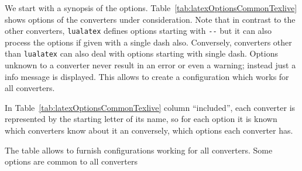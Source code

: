 \documentclass[a4paper]{article}%
\newcommand{\lualatex}{\texttt{lualatex}}
\begin{document}
We start with a synopsis of the options. 
Table~\ref{tab:latexOptionsCommonTexlive} 
shows options of the converters under consideration. 
Note that in contrast to the other converters, 
\lualatex{} defines options starting with \texttt{-{}-} 
but it can also process the options if given with a single dash also. 
Conversely, converters other than \lualatex{} can also deal with options 
starting with single dash. 
Options unknown to a converter never result in an error or even a warning; 
instead just a info message is displayed. 
This allows to create a configuration which works for all converters. 

In Table~\ref{tab:latexOptionsCommonTexlive} column ``included'', 
each converter is represented by the starting letter of its name, 
so for each option it is known which converters know about it 
an conversely, which options each converter has. 

The table allows to furnish configurations working for all converters. 
Some options are common to all converters
\end{document}
